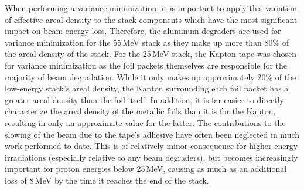 When performing  a variance minimization, it is important to apply this variation of effective areal density  to the stack components which  have the most significant impact on beam energy loss.
Therefore, the aluminum degraders are used for variance minimization for the 55\,MeV stack as they make up more than 80\% of the areal density of the stack.
For the 25\,MeV stack, the Kapton tape was chosen for variance minimization as the foil packets themselves are responsible for the majority of beam degradation.
While it only makes up approximately 20\% of the low-energy stack's areal density, the Kapton surrounding each foil packet has a greater areal density than the foil itself.
In addition, it is far easier to directly characterize the areal density of the metallic foils than it is for the Kapton, resulting in only an approximate value for the latter.
The contributions to the slowing of the beam due to the tape's adhesive have often been neglected in much work performed to date. 
This is of relatively minor consequence for higher-energy irradiations (especially relative to any beam degraders), but 
becomes increasingly important for proton energies below 
25\,MeV, causing as much as an additional loss of 8\,MeV  by the time it reaches the end of the stack.





